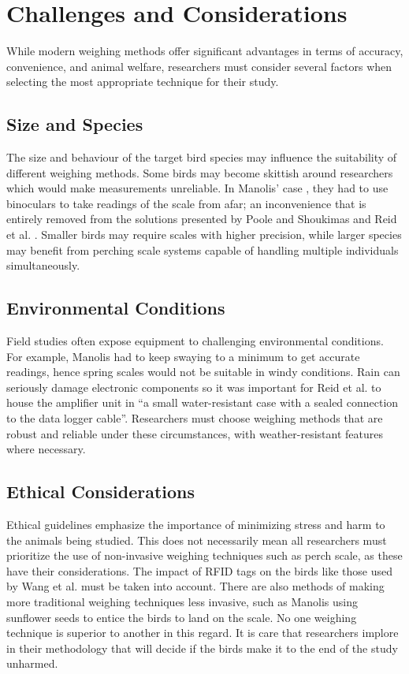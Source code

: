 \documentclass[class=report,11pt,crop=false]{standalone}
\begin{document}
\pagebreak
\section{Challenges and Considerations}
While modern weighing methods offer significant advantages in terms of accuracy, convenience, and animal welfare, researchers must consider several factors when selecting the most appropriate technique for their study.

\subsection{Size and Species}
The size and behaviour of the target bird species may influence the suitability of different weighing methods. Some birds may become skittish around researchers which would make measurements unreliable. In Manolis’ case \cite{manoils2024simple}, they had to use binoculars to take readings of the scale from afar; an inconvenience that is entirely removed from the solutions presented by Poole and Shoukimas \cite{poole1982scale} and Reid et al. \cite{reid1999measurement}. Smaller birds may require scales with higher precision, while larger species may benefit from perching scale systems capable of handling multiple individuals simultaneously.

\subsection{Environmental Conditions}
Field studies often expose equipment to challenging environmental conditions. For example, Manolis \cite{manoils2024simple} had to keep swaying to a minimum to get accurate readings, hence spring scales would not be suitable in windy conditions. Rain can seriously damage electronic components so it was important for Reid et al. \cite{reid1999measurement} to house the amplifier unit in “a small water-resistant case with a sealed connection to the data logger cable”. Researchers must choose weighing methods that are robust and reliable under these circumstances, with weather-resistant features where necessary.

\subsection{Ethical Considerations}
Ethical guidelines emphasize the importance of minimizing stress and harm to the animals being studied. This does not necessarily mean all researchers must prioritize the use of non-invasive weighing techniques such as perch scale, as these have their considerations. The impact of RFID tags on the birds like those used by Wang et al. \cite{wang2019rfid} must be taken into account. There are also methods of making more traditional weighing techniques less invasive, such as Manolis \cite{reid1999measurement} using sunflower seeds to entice the birds to land on the scale. No one weighing technique is superior to another in this regard. It is care that researchers implore in their methodology that will decide if the birds make it to the end of the study unharmed.

\ifstandalone

\printnoidxglossary[type=\acronymtype,nonumberlist]
\fi
\end{document}
